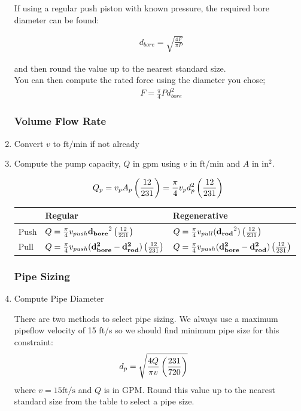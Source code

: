 \documentclass[11pt, fleqn]{article}
\begin{document}
\begin{enumerate}
   If using a regular push piston with known pressure, the required bore diameter can be found:
    
    \begin{align*}
        &d_{bore}=\sqrt{\frac{4F}{\pi P}}
    \end{align*}
    
    and then round the value up to the nearest standard size.\\
    You can then compute the rated force using the diameter you chose;
    \begin{align*}
        &F=\frac{\pi}{4}Pd_{bore}^2
    \end{align*}

    \subsubsection{Volume Flow Rate}
    \item Convert $v$ to $\mathrm{ft/min}$ if not already
    \item Compute the pump capacity, $Q$ in gpm using $v$ in ft/min and $A$ in $\text{in}^2$.
    
        $$Q_p=v_pA_p\left(\frac{12}{231}\right)=\frac{\pi}{4}v_pd_p^2\left(\frac{12}{231}\right)$$
    
        \begin{center}
        \renewcommand{\arraystretch}{2}
\begin{tabular}{l|l|l|}
\cline{2-3}
                           & Regular          & Regenerative     \\ \hline
\multicolumn{1}{|l|}{Push} & $Q=\frac{\pi}{4}v_{push}\mathbf{d_{bore}}^2\left(\frac{12}{231}\right)$ & $Q=\frac{\pi}{4}v_{pull}(\mathbf{d_{rod}}^2)\left(\frac{12}{231}\right)$    \\ \hline
\multicolumn{1}{|l|}{Pull} & $Q=\frac{\pi}{4}v_{push}(\mathbf{d_{bore}^2-d_{rod}^2})\left(\frac{12}{231}\right)$    & $Q=\frac{\pi}{4}v_{push}(\mathbf{d_{bore}^2-d_{rod}^2})\left(\frac{12}{231}\right)$  \\ \hline
\end{tabular}
    \end{center}
    \renewcommand{\arraystretch}{1}
    
\subsubsection{Pipe Sizing}
    \item Compute Pipe Diameter

    There are two methods to select pipe sizing.  We always use a maximum pipeflow velocity of 15 ft/s so we should find minimum pipe size for this constraint:
    \begin{align*}
        &d_p=\sqrt{\frac{4Q}{\pi v}\left(\frac{231}{720}\right)}
    \end{align*}
    where $v=15 \text{ft/s}$ and $Q$ is in GPM. Round this value up to the nearest standard size from the table to select a pipe size.  


\end{enumerate}
\end{document}
